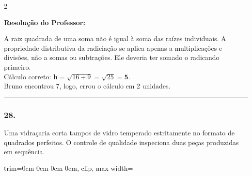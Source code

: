 \begin{multicols*}{2}
\ifgabarito
    \begin{tcolorbox}[colback=CorTitUm!5, colframe=CorTitUm, boxrule=1pt, arc=4pt, left=6pt, right=6pt, top=6pt, bottom=6pt]
    \small\textbf{\textcolor{CorTitUm}{Resolução do Professor:}}\par\vspace{0.1cm}
    \color{CinzaEscuro}
    A raiz quadrada de uma soma não é igual à soma das raízes individuais. A propriedade distributiva da radiciação se aplica apenas a multiplicações e divisões, não a somas ou subtrações. Ele deveria ter somado o radicando primeiro.\\
    Cálculo correto: $ \textbf{h} = \sqrt{16+9} = \sqrt{25} = \textbf{5} $.\\
    Bruno encontrou 7, logo, errou o cálculo em 2 unidades.
    \end{tcolorbox}
\fi

\par\vspace{\espacoQuestao}

\noindent\textcolor{CorLinha}{\rule{\linewidth}{0.5pt}} 
\par\vspace{\espacoPreQuestao}
\subsubsection*{28.} Uma vidraçaria corta tampos de vidro temperado estritamente no formato de quadrados perfeitos. O controle de qualidade inspeciona duas peças produzidas em sequência.
\begin{center}
\begin{adjustbox}{trim=0cm 0cm 0cm 0cm, clip, max width=\larguraTikz}
\end{adjustbox}
\end{center}
\end{multicols*}
